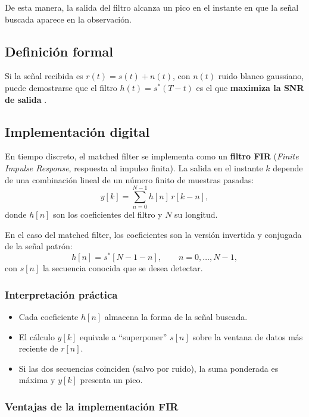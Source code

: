De esta manera, la salida del filtro alcanza un pico en el instante en que la señal buscada aparece en la observación.

\subsection{Definición formal}

Si la señal recibida es $r(t) = s(t) + n(t)$, con $n(t)$ ruido blanco gaussiano, 
puede demostrarse que el filtro $h(t)=s^*(T-t)$ es el que 
\textbf{maximiza la SNR de salida} \cite{Bancroft2002}.

\subsection{Implementación digital}

En tiempo discreto, el matched filter se implementa como un \textbf{filtro FIR} 
(\emph{Finite Impulse Response}, respuesta al impulso finita).  
La salida en el instante $k$ depende de una combinación lineal de un número finito de muestras pasadas:
\begin{equation}
	y[k] = \sum_{n=0}^{N-1} h[n]\, r[k-n],
\end{equation}
donde $h[n]$ son los coeficientes del filtro y $N$ su longitud.  

En el caso del matched filter, los coeficientes son la versión 
invertida y conjugada de la señal patrón:
\begin{equation}
	h[n] = s^*[N-1-n], \qquad n=0,\dots,N-1,
\end{equation}
con $s[n]$ la secuencia conocida que se desea detectar.

\subsubsection*{Interpretación práctica}

\begin{itemize}
	\item Cada coeficiente $h[n]$ almacena la forma de la señal buscada.  
	\item El cálculo $y[k]$ equivale a “superponer” $s[n]$ sobre la ventana de datos más reciente de $r[n]$.  
	\item Si las dos secuencias coinciden (salvo por ruido), la suma ponderada es máxima y $y[k]$ presenta un pico.  
\end{itemize}

\subsubsection*{Ventajas de la implementación FIR}

